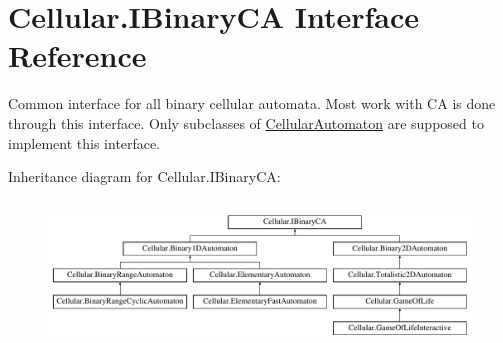 \hypertarget{interface_cellular_1_1_i_binary_c_a}{}\section{Cellular.\+I\+Binary\+C\+A Interface Reference}
\label{interface_cellular_1_1_i_binary_c_a}


Common interface for all binary cellular automata. Most work with C\+A is done through this interface. Only subclasses of {\ttfamily \hyperlink{class_cellular_1_1_cellular_automaton}{Cellular\+Automaton}} are supposed to implement this interface.  


Inheritance diagram for Cellular.\+I\+Binary\+C\+A\+:\begin{figure}[H]
\begin{center}
\leavevmode
\includegraphics[height=3.954802cm]{interface_cellular_1_1_i_binary_c_a}
\end{center}
\end{figure}
